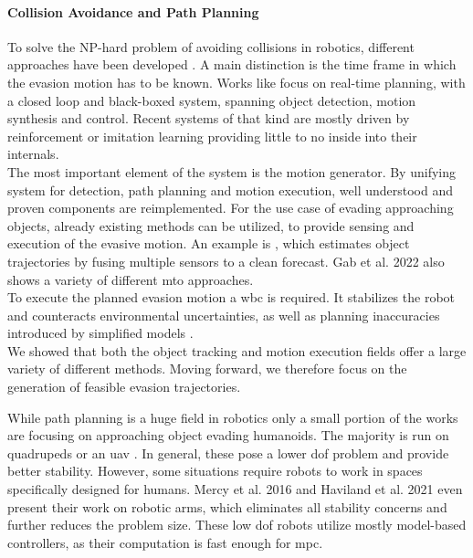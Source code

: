 \paragraph{Collision Avoidance and Path Planning} \label{sec:introduction:avoidance}
To solve the NP-hard problem of avoiding collisions in robotics, different approaches have been developed \cite{canny_1988}.
A main distinction is the time frame in which the evasion motion has to be known.
Works like \cite{yang_2026,kohlbrenner_2026} focus on real-time planning, with a closed loop and black-boxed system, spanning object detection, motion synthesis and control.
Recent systems of that kind are mostly driven by reinforcement or imitation learning providing little to no inside into their internals.
\\
The most important element of the system is the motion generator.
By unifying system for detection, path planning and motion execution, well understood and proven components are reimplemented.
For the use case of evading approaching objects, already existing methods can be utilized, to provide sensing and execution of the evasive motion.
An example is \cite{casas_2025}, which estimates object trajectories by fusing multiple sensors to a clean forecast.
Gab et al. 2022 \cite{gad_2022} also shows a variety of different \acrfull{mto} approaches.
\\
To execute the planned evasion motion a \acrfull{wbc} is required.
It stabilizes the robot and counteracts environmental uncertainties, as well as planning inaccuracies introduced by simplified models \cite{gu_2026}.
\\
We showed that both the object tracking and motion execution fields offer a large variety of different methods.
Moving forward, we therefore focus on the generation of feasible evasion trajectories.
\par %
While path planning is a huge field in robotics only a small portion of the works are focusing on approaching object evading humanoids.
The majority is run on quadrupeds or an \acrfull{uav} \cite{zhao_2026,zhang_2026,jacquet_2025}.
In general, these pose a lower \acrfull{dof} problem and provide better stability.
However, some situations require robots to work in spaces specifically designed for humans.
Mercy et al. 2016 \cite{mercy_2016} and Haviland et al. 2021 \cite {haviland_2021} even present their work on robotic arms, which eliminates all stability concerns and further reduces the problem size.
These low \acrshort{dof} robots utilize mostly model-based controllers, as their computation is fast enough for \acrfull{mpc}.
